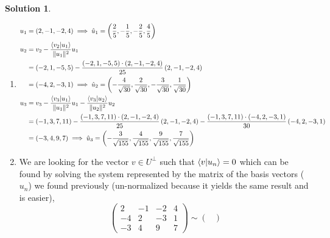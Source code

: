 \documentclass[10pt]{article}
\theoremstyle{definition}
\newtheorem{soln}{Solution}
\newcommand{\vlen}[1]{\| {#1}\Vert }
\begin{document}
\begin{soln}~
  \begin{enumerate}[label=(\alph*)]
    \item \begin{align*}
            u_1 & =\left(2,-1,-2,4\right)\implies \hat{u}_1=\left(\frac{2}{5},-\frac{1}{5},-\frac{2}{5},\frac{4}{5}\right)                                                                                      \\
            u_2 & =v_2-\frac{\braket{v_2}{u_1}}{\vlen{u_1}^2}u_1                                                                                                                                                \\
                & =\left(-2,1,-5,5\right)-\frac{\left(-2,1,-5,5\right)\cdot\left(2,-1,-2,4\right)}{25}\left(2,-1,-2,4\right)                                                                                    \\
                & =\left(-4,2,-3,1\right)\implies \hat{u}_2=\left(-\frac{4}{\sqrt{30}},\frac{2}{\sqrt{30}},-\frac{3}{\sqrt{30}},\frac{1}{\sqrt{30}}\right)                                                      \\
            u_3 & =v_3-\frac{\braket{v_3}{u_1}}{\vlen{u_1}^2}u_1-\frac{\braket{v_3}{u_2}}{\vlen{u_2}^2}u_2                                                                                                      \\
                & =\left(-1,3,7,11\right)-\frac{\left(-1,3,7,11\right)\cdot\left(2,-1,-2,4\right)}{25}\left(2,-1,-2,4\right)-\frac{\left(-1,3,7,11\right)\cdot\left(-4,2,-3,1\right)}{30}\left(-4,2,-3,1\right) \\
                & = \left(-3,4,9,7\right)\implies \hat{u}_3=\left(-\frac{3}{\sqrt{155}},\frac{4}{\sqrt{155}},\frac{9}{\sqrt{155}},\frac{7}{\sqrt{155}}\right)
          \end{align*}
    \item We are looking for the vector $v\in U^\perp$ such that $\braket{v}{u_n}=0$ which can be found by solving the system represented by the matrix of
          the basis vectors ($u_n$) we found previously (un-normalized because it yields the same result and is easier),
          $$\begin{pmatrix}
              2  & -1 & -2 & 4 \\
              -4 & 2  & -3 & 1 \\
              -3 & 4  & 9  & 7
            \end{pmatrix}\sim
            \begin{pmatrix}

\end{pmatrix}$$
\end{enumerate}
\end{soln}
\end{document}
